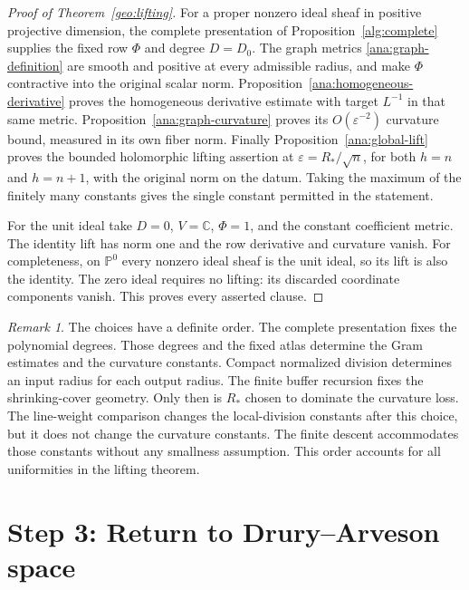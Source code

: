 \documentclass[11pt,reqno]{amsart}
\numberwithin{equation}{section}
\theoremstyle{definition}
\theoremstyle{remark}
\newtheorem{remark}[theorem]{Remark}
\newcommand{\C}{\mathbb C}
\newcommand{\Pj}{\mathbb P}
\begin{document}
\begin{proof}[Proof of Theorem~\ref{geo:lifting}]
For a proper nonzero ideal sheaf in positive projective dimension,
the complete presentation of Proposition~\ref{alg:complete} supplies
the fixed row $\Phi$ and degree $D=D_0$.  The graph metrics
\eqref{ana:graph-definition} are smooth and positive at every
admissible radius, and make $\Phi$ contractive into the original
scalar norm.  Proposition~\ref{ana:homogeneous-derivative} proves
the homogeneous derivative estimate with target $L^{-1}$ in that
same metric.  Proposition~\ref{ana:graph-curvature} proves its
$O(\varepsilon^{-2})$ curvature bound, measured in its own fiber
norm.  Finally Proposition~\ref{ana:global-lift} proves the bounded
holomorphic lifting assertion at $\varepsilon=R_*/\sqrt n$, for
both $h=n$ and $h=n+1$, with the original norm on the datum.
Taking the maximum of the finitely many constants gives the single
constant permitted in the statement.

For the unit ideal take $D=0$, $V=\C$, $\Phi=1$, and the constant
coefficient metric.  The identity lift has norm one and the row
derivative and curvature vanish.  For completeness, on $\Pj^0$ every nonzero ideal
sheaf is the unit ideal, so its lift is also the identity.
The zero ideal requires no lifting: its discarded coordinate
components vanish.  This proves every asserted clause.
\end{proof}

\begin{remark}\label{ana:constant-order}
The choices have a definite order.  The complete presentation fixes
the polynomial degrees.  Those degrees and the fixed atlas determine
the Gram estimates and the curvature constants.  Compact normalized
division determines an input radius for each output radius.  The
finite buffer recursion fixes the shrinking-cover geometry.
Only then is $R_*$ chosen to dominate the curvature loss.
The line-weight comparison changes the local-division constants
after this choice, but it does not change the curvature constants.
The finite descent accommodates those constants without any
smallness assumption.  This order accounts for all uniformities
in the lifting theorem.
\end{remark}



\section{Step 3: Return to Drury--Arveson space}
\label{sec:completion}
\end{document}
